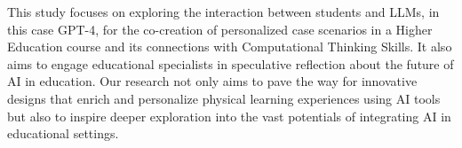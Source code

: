 \documentclass[sn-mathphys, Numbered]{sn-jnl}%
\theoremstyle{thmstyleone}%
\theoremstyle{thmstyletwo}%
\theoremstyle{thmstylethree}%
\begin{document}
This study focuses on exploring the interaction between students and LLMs, in this case GPT-4, for the co-creation of personalized case scenarios in a Higher Education course and its connections with Computational Thinking Skills. It also aims to engage educational specialists in speculative reflection about the future of AI in education. Our research not only aims to pave the way for innovative designs that enrich and personalize physical learning experiences using AI tools but also to inspire deeper exploration into the vast potentials of integrating AI in educational settings. 






\end{document}
